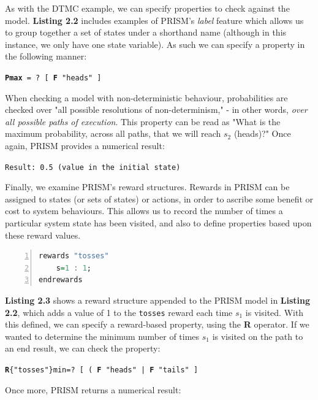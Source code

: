 \documentclass{l4proj}
\begin{document}
As with the DTMC example, we can specify properties to check against the model. \textbf{Listing 2.2} includes examples of PRISM's \textit{label} feature which allows us to group together a set of states under a shorthand name (although in this instance, we only have one state variable). As such we can specify a property in the following manner:

\begin{center}
    \texttt{\textbf{Pmax} = ? [ \textbf{F} "heads" ]}
\end{center}

When checking a model with non-deterministic behaviour, probabilities are checked over "all possible resolutions of non-determinism," \cite{prsmlang} - in other words, \textit{over all possible paths of execution}. This property can be read as "What is the maximum probability, across all paths, that we will reach $s_2$ (heads)?" Once again, PRISM provides a numerical result:

\begin{center}
    \texttt{Result: 0.5 (value in the initial state)}    
\end{center}

Finally, we examine PRISM's reward structures. Rewards in PRISM can be assigned to states (or sets of states) or actions, in order to ascribe some benefit or cost to system behaviours. This allows us to record the number of times a particular system state has been visited, and also to define properties based upon these reward values.

\begin{lstlisting}[language=Haskell, numbers=left, caption=A simple reward structure which could be appended to our MDP example.] 
rewards "tosses"
	s=1 : 1;
endrewards
\end{lstlisting}

\textbf{Listing 2.3} shows a reward structure appended to the PRISM model in \textbf{Listing 2.2}, which adds a value of 1 to the \texttt{tosses} reward each time $s_1$ is visited. With this defined, we can specify a reward-based property, using the \textbf{R} operator. If we wanted to determine the minimum number of times $s_1$ is visited on the path to an end result, we can check the property:

\begin{center}
    \texttt{\textbf{R}\{"tosses"\}min=? [ ( \textbf{F} "heads" | \textbf{F} "tails" ]}    
\end{center}

Once more, PRISM returns a numerical result:
\end{document}
